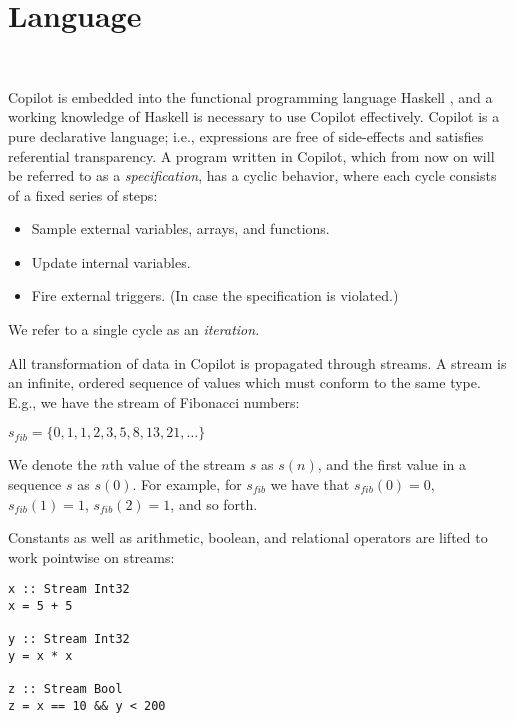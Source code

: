 
\section{Language}~\label{sec:language}

Copilot is embedded into the functional programming language Haskell
\cite{PeytonJones02}, and a working knowledge of Haskell is necessary to use
Copilot effectively. Copilot is a pure declarative language; i.e., expressions
are free of side-effects and satisfies referential transparency.  A program
written in Copilot, which from now on will be referred to as a
\emph{specification}, has a cyclic behavior, where each cycle consists of a
fixed series of steps:

\begin{itemize}
\item Sample external variables, arrays, and functions.
\item Update internal variables.
\item Fire external triggers. (In case the specification is violated.)
\end{itemize}

\noindent We refer to a single cycle as an \emph{iteration}.

All transformation of data in Copilot is propagated through streams.
A stream is an infinite, ordered sequence of values which must conform to the same type.
E.g., we have the stream of Fibonacci numbers:

\begin{center}
$s_{fib} = \{0, 1, 1, 2, 3, 5, 8, 13, 21, \dots \}$
\end{center}

\noindent We denote the $n$th value of the stream $s$ as $s(n)$, and the first
value in a sequence $s$ as $s(0)$. For example, for $s_{fib}$ we have that $s_{fib}(0) = 0$,
$s_{fib}(1) = 1$, $s_{fib}(2) = 1$, and so forth.

Constants as well as arithmetic, boolean, and relational operators are
lifted to work pointwise on streams:

\noindent
\begin{lstlisting}
x :: Stream Int32
x = 5 + 5

y :: Stream Int32
y = x * x

z :: Stream Bool
z = x == 10 && y < 200
\end{lstlisting}


